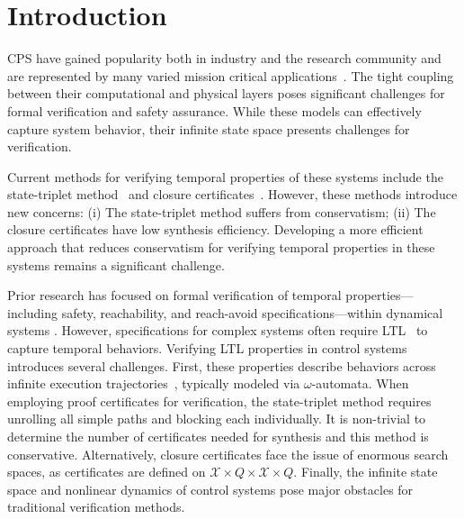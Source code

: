 \section{Introduction}
CPS have gained popularity both in industry and the research community and are represented by many varied mission critical applications~\cite{rajkumar2010cyber}. The tight coupling between their computational and physical layers poses significant challenges for formal verification and safety assurance. While these models can effectively capture system behavior, their infinite state space presents challenges for verification. 

Current methods for verifying temporal properties of these systems include the state-triplet method~\cite{wongpiromsarn2015automata} and closure certificates~\cite{murali2024closure}. However, these methods introduce new concerns: (i) The state-triplet method suffers from conservatism; (ii) The closure certificates have low synthesis efficiency. Developing a more efficient approach that reduces conservatism for verifying temporal properties in these systems remains a significant challenge.

Prior research has focused on formal verification of temporal properties---including safety, reachability, and reach-avoid specifications---within dynamical systems \cite{xue2021reach, vzikelic2023learning, ansaripour2023learning, vzikelic2023compositional, neustroev2025neural}. However, specifications for complex systems often require LTL~\cite{pnueli1977temporal} to capture temporal behaviors. Verifying LTL properties in control systems introduces several challenges. First, these properties describe behaviors across infinite execution trajectories~\cite{baier2008principles}, typically modeled via $\omega$-automata. When employing proof certificates for verification, the state-triplet method requires unrolling all simple paths and blocking each individually. It is non-trivial to determine the number of certificates needed for synthesis and this method is conservative. Alternatively, closure certificates face the issue of enormous search spaces, as certificates are defined on $\mathcal{X} \times Q \times \mathcal{X} \times Q$. Finally, the infinite state space and nonlinear dynamics of control systems pose major obstacles for traditional verification methods.

